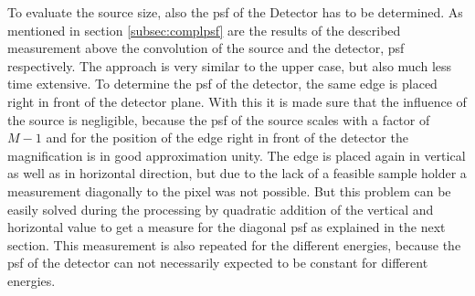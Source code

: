 To evaluate the source size, also the \gls{psf} of the Detector has to be determined. As mentioned in section \ref{subsec:complpsf} are the results of the described measurement above the convolution of the source and the detector, \gls{psf} respectively. The approach is very similar to the upper case, but also much less time extensive. To determine the \gls{psf} of the detector, the same edge is placed right in front of the detector plane. With this it is made sure that the influence of the source is negligible, because the \gls{psf} of the source scales with a factor of $M-1$ and for the position of the edge right in front of the detector the magnification is in good approximation unity. The edge is placed again in vertical as well as in horizontal direction, but due to the lack of a feasible sample holder a measurement diagonally to the pixel was not possible. But this problem can be easily solved during the processing by quadratic addition of the vertical and horizontal value to get a measure for the diagonal \gls{psf} as explained in the next section. This measurement is also repeated for the different energies, because the \gls{psf} of the detector can not necessarily expected to be constant for different energies. 
